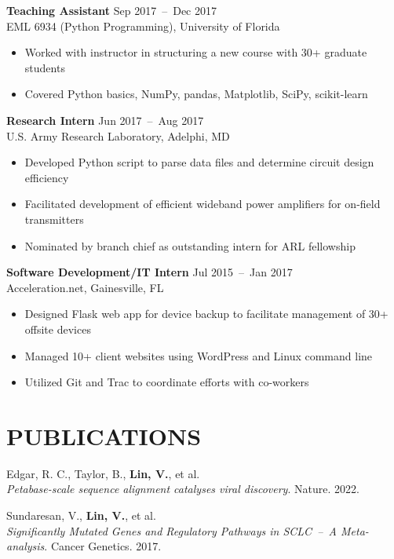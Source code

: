 \documentclass[line,resmargin]{res}
\begin{document}
\begin{resume}
    \textbf{Teaching Assistant}    \hfill Sep 2017~--~Dec 2017 \\
    EML 6934 (Python Programming), University of Florida
    \begin{itemize}  \itemsep -2pt
        \item Worked with instructor in structuring a new course with 30+ graduate students
        \item Covered Python basics, NumPy, pandas, Matplotlib, SciPy, scikit-learn
    \end{itemize}

    \textbf{Research Intern}    \hfill Jun 2017~--~Aug 2017 \\
    U.S. Army Research Laboratory, Adelphi, MD
    \begin{itemize}  \itemsep -2pt
        \item Developed Python script to parse data files and determine circuit design efficiency
        \item Facilitated development of efficient wideband power amplifiers for on-field transmitters
        \item Nominated by branch chief as outstanding intern for ARL fellowship
    \end{itemize}

    \textbf{Software Development/IT Intern}    \hfill Jul 2015~--~Jan 2017 \\
    Acceleration.net, Gainesville, FL
    \begin{itemize}  \itemsep -2pt
        \item Designed Flask web app for device backup to facilitate management of 30+ offsite devices
        \item Managed 10+ client websites using WordPress and Linux command line
        \item Utilized Git and Trac to coordinate efforts with co-workers
    \end{itemize}

\section{PUBLICATIONS}
    Edgar, R. C., Taylor, B., \textbf{Lin, V.}, et al. \\
    \textit{Petabase-scale sequence alignment catalyses viral discovery}. Nature. 2022.

    Sundaresan, V., \textbf{Lin, V.}, et al. \\
    \textit{Significantly Mutated Genes and Regulatory Pathways in SCLC~--~A Meta-analysis}. Cancer Genetics. 2017.


\end{resume}
\end{document}
